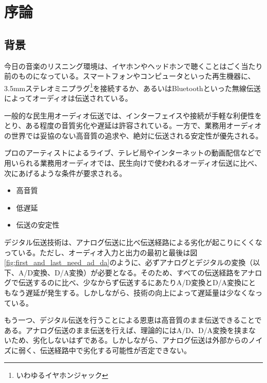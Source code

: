 \chapter{序論}
\label{chap:introduction}

\section{背景}
\label{section:background}

今日の音楽のリスニング環境は、イヤホンやヘッドホンで聴くことはごく当たり前のものになっている。スマートフォンやコンピュータといった再生機器に、3.5mmステレオミニプラグ\footnote{いわゆるイヤホンジャック}を接続するか、あるいはBluetoothといった無線伝送によってオーディオは伝送されている。

一般的な民生用オーディオ伝送では、インターフェイスや接続が手軽な利便性をとり、ある程度の音質劣化や遅延は許容されている。一方で、業務用オーディオの世界では妥協のない高音質の追求や、絶対に伝送される安定性が優先される。

プロのアーティストによるライブ、テレビ局やインターネットの動画配信などで用いられる業務用オーディオでは、民生向けで使われるオーディオ伝送に比べ、次にあげるような条件が要求される。

\begin{itemize}
  \item 高音質
  \item 低遅延
  \item 伝送の安定性
\end{itemize}

デジタル伝送技術は、アナログ伝送に比べ伝送経路による劣化が起こりにくくなっている。ただし、オーディオ入力と出力の最初と最後は図\ref{fig:first_and_last_need_ad_da}のように、必ずアナログとデジタルの変換（以下、A/D変換、D/A変換）が必要となる。そのため、すべての伝送経路をアナログで伝送するのに比べ、少なからず伝送するにあたりA/D変換とD/A変換にともなう遅延が発生する。しかしながら、技術の向上によって遅延量は少なくなっている。


もう一つ、デジタル伝送を行うことによる恩恵は高音質のまま伝送できることである。アナログ伝送のまま伝送を行えば、理論的にはA/D、D/A変換を挟まないため、劣化しないはずである。しかしながら、アナログ伝送は外部からのノイズに弱く、伝送経路中で劣化する可能性が否定できない。

